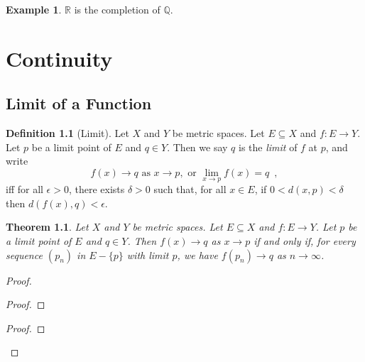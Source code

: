 \documentclass{book}
\let\qed\relax
\newtheorem{thm}[prop]{Theorem}
\theoremstyle{definition}
\newtheorem{df}[prop]{Definition}
\newtheorem{ex}[prop]{Example}
\begin{document}
\begin{ex}
$\mathbb{R}$ is the completion of $\mathbb{Q}$.
\end{ex}

\chapter{Continuity}

\section{Limit of a Function}

\begin{df}[Limit]
Let $X$ and $Y$ be metric spaces. Let $E \subseteq X$ and $f : E \rightarrow Y$. Let $p$ be a limit point of $E$ and $q \in Y$. Then we say $q$ is the \emph{limit} of $f$ at $p$, and write
\[ f(x) \rightarrow q \text{ as } x \rightarrow p, \text{ or } \lim_{x \rightarrow p} f(x) = q \enspace , \]
iff for all $\epsilon > 0$, there exists $\delta > 0$ such that, for all $x \in E$, if $0 < d(x,p) < \delta$ then $d(f(x),q) < \epsilon$.
\end{df}

\begin{thm}
\label{thm:limits_and_sequences}
Let $X$ and $Y$ be metric spaces. Let $E \subseteq X$ and $f : E \rightarrow Y$. Let $p$ be a limit point of $E$ and $q \in Y$. Then $f(x) \rightarrow q$ as $x \rightarrow p$ if and only if, for every sequence $(p_n)$ in $E - \{p\}$ with limit $p$, we have $f(p_n) \rightarrow q$ as $n \rightarrow \infty$.
\end{thm}

\begin{proof}
\pf
{}
\begin{proof}
\end{proof}
\begin{proof}
\end{proof}
\qed
\end{proof}
\end{document}
